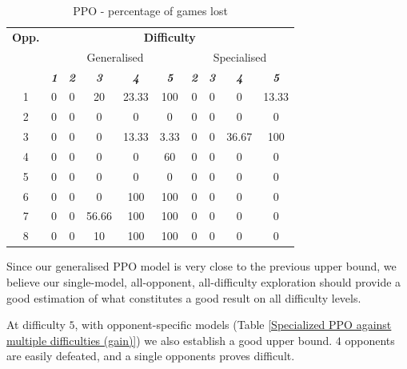 \documentclass[conference]{IEEEtran}
\begin{document}
    \begin{table}[htbp]
        \caption{PPO - percentage of games lost}
        \begin{center}
            \begin{tabular}{|c|c|c|c|c|c|c|c|c|c|}
                \hline
              \textbf{Opp.}&\multicolumn{9}{|c|}{\textbf{Difficulty}} \\
              \cline{2-10}
                           & \multicolumn{5}{|c|}{Generalised} & \multicolumn{4}{|c|}{Specialised} \\
              \cline{2-10}
                & \textbf{\textit{1}}& \textbf{\textit{2}}& \textbf{\textit{3}} & \textbf{\textit{4}} & \textbf{\textit{5}} & \textbf{\textit{2}}& \textbf{\textit{3}} & \textbf{\textit{4}} & \textbf{\textit{5}}\\
                \hline
                 1 &  0 &  0 &     20 &  23.33 &   100 & 0 & 0 & 0     & 13.33 \\
                 2 &  0 &  0 &      0 &      0 &     0 & 0 & 0 & 0     & 0 \\
                 3 &  0 &  0 &      0 &  13.33 &  3.33 & 0 & 0 & 36.67 & 100 \\
                 4 &  0 &  0 &      0 &      0 &    60 & 0 & 0 & 0     & 0 \\
                 5 &  0 &  0 &      0 &      0 &     0 & 0 & 0 & 0     & 0 \\
                 6 &  0 &  0 &      0 &    100 &   100 & 0 & 0 & 0     & 0 \\
                 7 &  0 &  0 &  56.66 &    100 &   100 & 0 & 0 & 0     & 0 \\
                 8 &  0 &  0 &     10 &    100 &   100 & 0 & 0 & 0     & 0 \\
                \hline
            \end{tabular}
            \label{PPO against all opponents games lost}
        \end{center}
    \end{table}

    Since our generalised PPO model is very close to the previous upper bound, we believe our single-model, all-opponent, all-difficulty exploration should provide a good estimation of what constitutes a good result on all difficulty levels.

    At difficulty $5$, with opponent-specific models (Table \ref{Specialized PPO against multiple difficulties (gain)}) we also establish a good upper bound. $4$ opponents are easily defeated, and a single opponents proves difficult.
  
\end{document}
